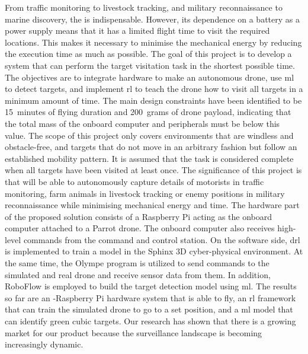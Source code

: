 \documentclass[../main.tex]{subfiles}
\begin{document}
From traffic monitoring to livestock tracking, and 
military reconnaissance to marine discovery, the \uav
is indispensable.
However, its dependence on a battery as a power supply means
that it has a limited flight time to visit the required
locations. This makes it necessary to minimise 
the mechanical energy by reducing the execution time as much
as possible.
The goal of this project is to develop a system 
that can perform the target visitation task in the shortest
possible time. The objectives are to integrate hardware to make
an autonomous drone, use \gls{ml} 
to detect targets,
and implement \gls{rl} to 
teach the drone how to visit all targets in a minimum amount of time.
The main design constraints have been identified to be 
\SI{15}{minutes} of flying duration and \SI{200}{grams}
of drone payload, indicating that the total mass of the 
onboard computer and peripherals must be below this
value. The scope of this project only covers 
environments that are windless and obstacle-free,
and targets that do not move in an arbitrary fashion but follow
an established mobility pattern. It is assumed that 
the task is considered
complete when all targets have been visited at least once.
The significance of this project is that \uavs will be
able to autonomously capture details of motorists in
traffic monitoring, farm animals in livestock tracking
or enemy positions in military reconnaissance 
while minimising mechanical energy and time.
The hardware part of the proposed solution 
consists of a Raspberry Pi acting as the onboard computer
attached to a Parrot \anafi drone. The onboard computer
also receives high-level commands from the command and control
station. On the software side, \gls{drl} is 
implemented to train a model in the Sphinx 3D
cyber-physical environment. At the same time,
the Olympe program is utilized
to send commands to the simulated and real \anafi drone
and receive sensor data from them. 
In addition, RoboFlow is employed
to build the target detection model using \gls{ml}.
The results so far are an \anafi-Raspberry Pi hardware system
that is able to fly, an \gls{rl} framework that can train the
simulated drone to go to a set position, and a \gls{ml}
model that can identify green cubic targets.
Our research has shown that there is a growing market for
our product because the surveillance landscape
is becoming increasingly dynamic.
\end{document}

